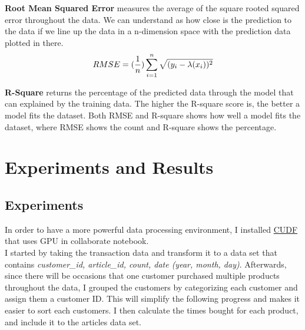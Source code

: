 \documentclass{article}
\begin{document}
\textbf{Root Mean Squared Error} measures the average of the square rooted squared error throughout the data. We can understand as how close is the prediction to the data if we line up the data in a n-dimension space with the prediction data plotted in there.
\begin{equation} 
RMSE = (\frac{1}{n})\sum_{i=1}^{n}\sqrt{( y_{i} -  \lambda(x_{i}))^2}\\
\end{equation}

\textbf{R-Square} returns the percentage of the predicted data through the  model that can explained by the training data. The higher the R-square score is, the better a model fits the dataset. Both RMSE and R-square shows how well a model fits the dataset, where RMSE shows the count and R-square shows the percentage.


\section{Experiments and Results}
\subsection{Experiments}
In order to have a more powerful data processing environment, I installed \href{https://github.com/rapidsai/cudf}{CUDF} that uses GPU in collaborate notebook.\\

I started by taking the transaction data and transform it to a data set that contains \textit{customer\_id, article\_id, count, date (year, month, day)}. Afterwards, since there will be occasions that one customer purchased multiple products throughout the data, I grouped the customers by categorizing each customer and assign them a customer ID. This will simplify the following progress and makes it easier to sort each customers. I then calculate the times bought for each product, and include it to the articles data set.
\end{document}
